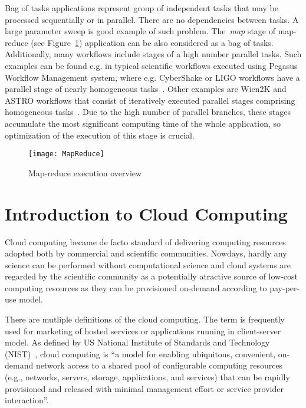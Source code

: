 Bag of tasks applications represent group of independent tasks that may be processed sequentially or in parallel. There are no dependencies between tasks. A large parameter sweep is good example of such problem. The \emph{map} stage of map-reduce (see Figure~\ref{fig:intro:mapreduce}) application can be also considered as a bag of tasks. Additionally, many workflows include stages of a high number parallel tasks. Such examples can be found e.g. in typical scientific workflows executed using Pegasus Workflow Management system, where e.g. CyberShake or LIGO workflows have a parallel stage of nearly homogeneous tasks~\cite{Bharathi08}. Other examples are Wien2K and ASTRO workflows that consist of iteratively executed parallel stages comprising homogeneous tasks~\cite{Duan12}. Due to the high number of parallel branches, these stages accumulate the most significant computing time of the whole application, so optimization of the execution of this stage is crucial.


\begin{figure}[tb]
   \centering
   \texttt{[image: MapReduce]}  
   \caption{Map-reduce execution overview\cite{Dean:2008:MapReduce}}
   \label{fig:intro:mapreduce}
\end{figure} 


\section{Introduction to Cloud Computing}
\label{intro:cloud}

Cloud computing became de facto standard of delivering computing resources adopted both by commercial and scientific communities. Nowdays, hardly any science can be performed without computational science and cloud systems are regarded by the scientific community as a potentially atractive source of low-cost computing resources as they can be provisioned on-demand according to pay-per-use model. 

There are mutliple definitions of the cloud computing. The term is frequently used for marketing of hosted services or applications running in client-server model. As defined by US National Institute of Standards and Technology (NIST)~\cite{NISTCloudDef}, cloud computing is “a model for enabling ubiquitous, convenient, on-demand network access to a shared pool of configurable computing resources (e.g., networks, servers, storage, applications, and services) that can be rapidly provisioned and released with minimal management effort or service provider interaction”.

